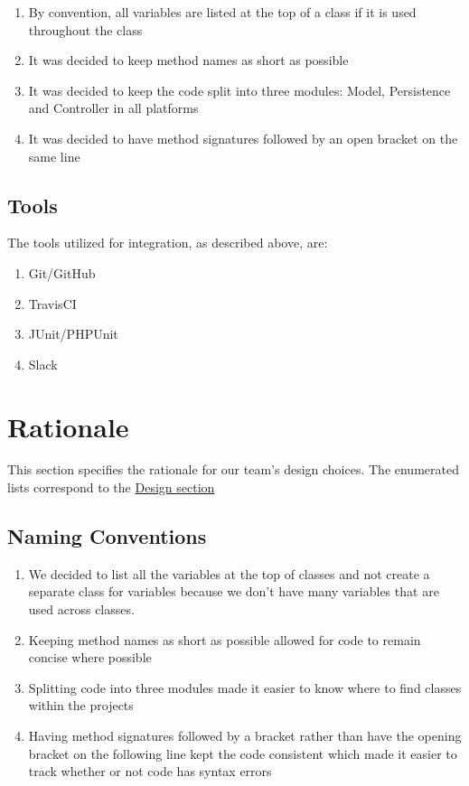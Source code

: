 \documentclass[12pt]{report}
\begin{document}
\begin{enumerate}
    \item By convention, all variables are listed at the top of a class if it is used throughout the class
    \item It was decided to keep method names as short as possible
    \item It was decided to keep the code split into three modules: Model, Persistence and Controller in all platforms
    \item It was decided to have method signatures followed by an open bracket on the same line
\end{enumerate}

\subsection{Tools} The tools utilized for integration, as described above, are:
\begin{enumerate}
    \item Git/GitHub
    \item TravisCI
    \item JUnit/PHPUnit
    \item Slack
\end{enumerate}

\section{Rationale}
\label{s:integration-rationale}
This section specifies the rationale for our team's design choices. The enumerated lists correspond to the \hyperref[s:integration-design]{Design section}

\subsection{Naming Conventions}
\begin{enumerate}
    \item We decided to list all the variables at the top of classes and not create a separate class for variables because we don't have many variables that are used across classes.
    \item Keeping method names as short as possible allowed for code to remain concise where possible
    \item Splitting code into three modules made it easier to know where to find classes within the projects
    \item Having method signatures followed by a bracket rather than have the opening bracket on the following line kept the code consistent which made it easier to track whether or not code has syntax errors
\end{enumerate}
\end{document}
